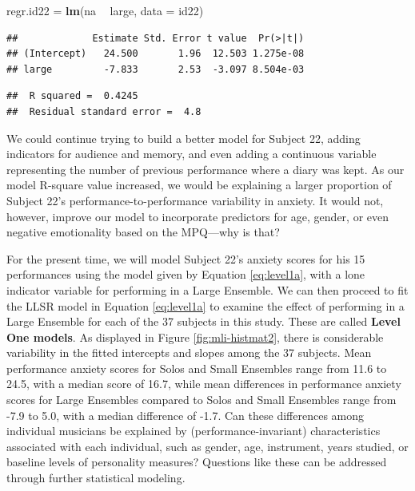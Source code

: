 \documentclass[
]{krantz}
\newenvironment{Shaded}{\begin{snugshade}}{\end{snugshade}}
\newcommand{\DataTypeTok}[1]{\textcolor[rgb]{0.27,0.27,0.27}{#1}}
\newcommand{\KeywordTok}[1]{\textcolor[rgb]{0.27,0.27,0.27}{\textbf{#1}}}
\newcommand{\NormalTok}[1]{#1}
\newcommand{\OperatorTok}[1]{\textcolor[rgb]{0.43,0.43,0.43}{\textbf{#1}}}
\newcommand{\StringTok}[1]{\textcolor[rgb]{0.5,0.5,0.5}{#1}}
\begin{document}
\begin{Shaded}
\begin{Highlighting}[]
\NormalTok{regr.id22 =}\StringTok{ }\KeywordTok{lm}\NormalTok{(na }\OperatorTok{~}\StringTok{ }\NormalTok{large, }\DataTypeTok{data =}\NormalTok{ id22)}
\end{Highlighting}
\end{Shaded}

\begin{verbatim}
##             Estimate Std. Error t value  Pr(>|t|)
## (Intercept)   24.500       1.96  12.503 1.275e-08
## large         -7.833       2.53  -3.097 8.504e-03
\end{verbatim}

\begin{verbatim}
##  R squared =  0.4245 
##  Residual standard error =  4.8
\end{verbatim}

We could continue trying to build a better model for Subject 22, adding indicators for audience and memory, and even adding a continuous variable representing the number of previous performance where a diary was kept. As our model R-square value increased, we would be explaining a larger proportion of Subject 22's performance-to-performance variability in anxiety. It would not, however, improve our model to incorporate predictors for age, gender, or even negative emotionality based on the MPQ---why is that?

For the present time, we will model Subject 22's anxiety scores for his 15 performances using the model given by Equation \eqref{eq:level1a}, with a lone indicator variable for performing in a Large Ensemble. We can then proceed to fit the LLSR model in Equation \eqref{eq:level1a} to examine the effect of performing in a Large Ensemble for each of the 37 subjects in this study. These are called \textbf{Level One models}.  As displayed in Figure \ref{fig:mli-histmat2}, there is considerable variability in the fitted intercepts and slopes among the 37 subjects. Mean performance anxiety scores for Solos and Small Ensembles range from 11.6 to 24.5, with a median score of 16.7, while mean differences in performance anxiety scores for Large Ensembles compared to Solos and Small Ensembles range from -7.9 to 5.0, with a median difference of -1.7. Can these differences among individual musicians be explained by (performance-invariant) characteristics associated with each individual, such as gender, age, instrument, years studied, or baseline levels of personality measures? Questions like these can be addressed through further statistical modeling.
\end{document}
